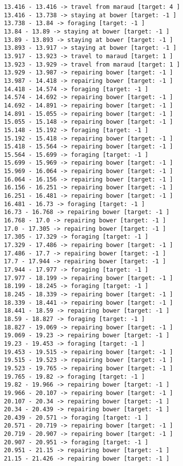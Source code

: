 \documentclass[11pt]{article}
\begin{document}
\begin{Verbatim}[commandchars=\\\{\}]
13.416 - 13.416 -> travel from maraud [target: 4 ]
13.416 - 13.738 -> staying at bower [target: -1 ]
13.738 - 13.84 -> foraging [target: -1 ]
13.84 - 13.89 -> staying at bower [target: -1 ]
13.89 - 13.893 -> staying at bower [target: -1 ]
13.893 - 13.917 -> staying at bower [target: -1 ]
13.917 - 13.923 -> travel to maraud [target: 1 ]
13.923 - 13.929 -> travel from maraud [target: 1 ]
13.929 - 13.987 -> repairing bower [target: -1 ]
13.987 - 14.418 -> repairing bower [target: -1 ]
14.418 - 14.574 -> foraging [target: -1 ]
14.574 - 14.692 -> repairing bower [target: -1 ]
14.692 - 14.891 -> repairing bower [target: -1 ]
14.891 - 15.055 -> repairing bower [target: -1 ]
15.055 - 15.148 -> repairing bower [target: -1 ]
15.148 - 15.192 -> foraging [target: -1 ]
15.192 - 15.418 -> repairing bower [target: -1 ]
15.418 - 15.564 -> repairing bower [target: -1 ]
15.564 - 15.699 -> foraging [target: -1 ]
15.699 - 15.969 -> repairing bower [target: -1 ]
15.969 - 16.064 -> repairing bower [target: -1 ]
16.064 - 16.156 -> repairing bower [target: -1 ]
16.156 - 16.251 -> repairing bower [target: -1 ]
16.251 - 16.481 -> repairing bower [target: -1 ]
16.481 - 16.73 -> foraging [target: -1 ]
16.73 - 16.768 -> repairing bower [target: -1 ]
16.768 - 17.0 -> repairing bower [target: -1 ]
17.0 - 17.305 -> repairing bower [target: -1 ]
17.305 - 17.329 -> foraging [target: -1 ]
17.329 - 17.486 -> repairing bower [target: -1 ]
17.486 - 17.7 -> repairing bower [target: -1 ]
17.7 - 17.944 -> repairing bower [target: -1 ]
17.944 - 17.977 -> foraging [target: -1 ]
17.977 - 18.199 -> repairing bower [target: -1 ]
18.199 - 18.245 -> foraging [target: -1 ]
18.245 - 18.339 -> repairing bower [target: -1 ]
18.339 - 18.441 -> repairing bower [target: -1 ]
18.441 - 18.59 -> repairing bower [target: -1 ]
18.59 - 18.827 -> foraging [target: -1 ]
18.827 - 19.069 -> repairing bower [target: -1 ]
19.069 - 19.23 -> repairing bower [target: -1 ]
19.23 - 19.453 -> foraging [target: -1 ]
19.453 - 19.515 -> repairing bower [target: -1 ]
19.515 - 19.523 -> repairing bower [target: -1 ]
19.523 - 19.765 -> repairing bower [target: -1 ]
19.765 - 19.82 -> foraging [target: -1 ]
19.82 - 19.966 -> repairing bower [target: -1 ]
19.966 - 20.107 -> repairing bower [target: -1 ]
20.107 - 20.34 -> repairing bower [target: -1 ]
20.34 - 20.439 -> repairing bower [target: -1 ]
20.439 - 20.571 -> foraging [target: -1 ]
20.571 - 20.719 -> repairing bower [target: -1 ]
20.719 - 20.907 -> repairing bower [target: -1 ]
20.907 - 20.951 -> foraging [target: -1 ]
20.951 - 21.15 -> repairing bower [target: -1 ]
21.15 - 21.426 -> repairing bower [target: -1 ]

\end{Verbatim}
\end{document}
